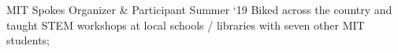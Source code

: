 \experience
    {MIT Spokes}
    {Organizer \& Participant}
    {Summer `19}
    {
        Biked across the country and taught STEM workshops at local schools / libraries with seven
        other MIT students;
    }
